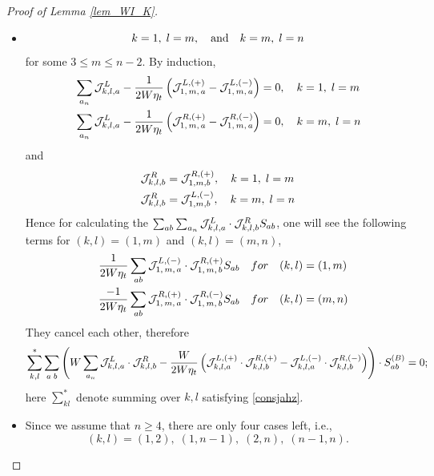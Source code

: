 \documentclass[10pt,reqno]{article}
\theoremstyle{plain} %
\theoremstyle{remark}
\numberwithin{equation}{section}
\begin{document}
\begin{proof}[Proof of Lemma \ref{lem_WI_K}]
\begin{itemize}
\item 
\begin{equation}\label{consjahz}
    k=1,\; l=m,  \quad \hbox{and}\quad   k=m, \;  l=n
\end{equation} 
for some $3\le m\le n-2 $. By induction, 
\begin{align}\label{awslw22}
    &\sum_{a_n}{\cal J}^{L}_{k,l,a}-\frac{1}{2W\eta_t}\left({\cal J}^{L,(+)}_{1,\,m,\,a} -{\cal J}^{L,(-)}_{1,\,m,\,a} \right)=0,\quad  k=1, \; l=m
    \\\nonumber
    &\sum_{a_n}{\cal J}^{L}_{k,l,a}-\frac{1}{2W\eta_t}\left({\cal J}^{R,(+)}_{1,\,m,\,a} -{\cal J}^{R,(-)}_{1,\,m,\,a} \right)=0,\quad  k=m, \; l=n
\end{align} 
and 
\begin{align}\label{awslw33}
    &{\cal J}^R_{k,l,b}={\cal J}^{R,(+)}_{1,m,b},\quad  k=1, \; l=m
    \\\nonumber
    &{\cal J}^R_{k,l,b}={\cal J}^{L,(-)}_{1,m,b},\quad  k=m, \; l=n
\end{align}
Hence  for calculating the  $\sum_{ab}\sum_{a_n} 
        {\cal J}^{L}_{k,l,a}\cdot{\cal J}^{R}_{k,l,b}S_{ab}$, one will see the following terms for $(k,l)=(1,m)$ and $(k,l)=(m,n)$, 
  \begin{align}\nonumber
   \frac{1}{2W\eta_t}   \sum_{ab}  {\cal J}^{L,(-)}_{1,\,m,\,a}\cdot {\cal J}^{R,(+)}_{1,\,m,\,b} S_{ab}\quad  & for \quad (k,l)=(1,m)\\\nonumber
\quad  \frac{-1}{2W\eta_t} \sum_{ab}  {\cal J}^{R,(+)}_{1,\,m,\,a}\cdot {\cal J}^{R,(-)}_{1,\,m,\,b} S_{ab}\quad &  for \quad (k,l)=( m,n)
  \end{align}
   They  cancel each other,  therefore %
 \begin{align}\label{uisiip}
    \sum_{k,l}^*  \sum_{a\;b}
    \left( {W}\sum_{a_n} 
        {\cal J}^{L}_{k,l,a}\cdot{\cal J}^{R}_{k,l,b}
        -\frac{W}{2W\eta_t} 
        \left(
        {\cal J}^{L,(+)}_{k,l,a}\cdot{\cal J}^{R,(+)}_{k,l,b}
        -
        {\cal J}^{L,(-)}_{k,l,a}\cdot{\cal J}^{R,(-)}_{k,l,b}
        \right)
        \right)\cdot S^{(B)}_{ab} =0; 
 \end{align}
 here  $\sum_{kl}^*$ denote   summing  over  $k,l$ satisfying  \eqref{consjahz}.  

 \item Since we assume that  $n\ge 4$, there are only four cases left, i.e., 
 \begin{equation}\label{keayew}
  (k,l)=(1,2), \; (1,n-1), \;(2,n), \;(n-1, n).
 \end{equation}
 

\end{itemize}
\end{proof}
\end{document}
